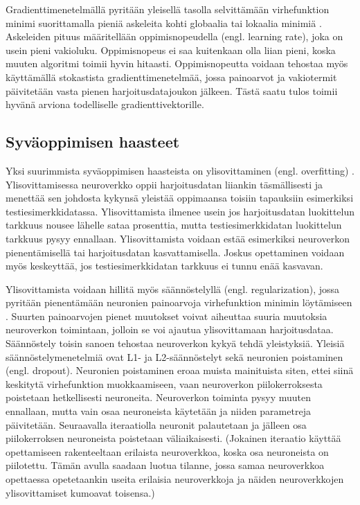 \documentclass[utf8]{gradu3}
\begin{document}
Gradienttimenetelmällä pyritään yleisellä tasolla selvittämään virhefunktion minimi suorittamalla pieniä askeleita kohti globaalia tai lokaalia minimiä \parencite{nielsen2015neural}. Askeleiden pituus määritellään oppimisnopeudella (engl. learning rate), joka on usein pieni vakioluku. Oppimisnopeus ei saa kuitenkaan olla liian pieni, koska muuten algoritmi toimii hyvin hitaasti. Oppimisnopeutta voidaan tehostaa myös käyttämällä stokastista gradienttimenetelmää, jossa painoarvot ja vakiotermit päivitetään vasta pienen harjoitusdatajoukon jälkeen. Tästä saatu tulos toimii hyvänä arviona todelliselle gradienttivektorille.

\subsection{Syväoppimisen haasteet}

Yksi suurimmista syväoppimisen haasteista on ylisovittaminen (engl. overfitting) \parencite{nielsen2015neural}. Ylisovittamisessa neuroverkko oppii harjoitusdatan liiankin täsmällisesti ja menettää sen johdosta kykynsä yleistää oppimaansa toisiin tapauksiin esimerkiksi testiesimerkkidatassa. Ylisovittamista ilmenee usein jos harjoitusdatan luokittelun tarkkuus nousee lähelle sataa prosenttia, mutta testiesimerkkidatan luokittelun tarkkuus pysyy ennallaan. Ylisovittamista voidaan estää esimerkiksi neuroverkon pienentämisellä tai harjoitusdatan kasvattamisella. Joskus opettaminen voidaan myös keskeyttää, jos testiesimerkkidatan tarkkuus ei tunnu enää kasvavan.

Ylisovittamista voidaan hillitä myös säännöstelyllä (engl. regularization), jossa pyritään pienentämään neuronien painoarvoja virhefunktion minimin löytämiseen \parencite{nielsen2015neural}. Suurten painoarvojen pienet muutokset voivat aiheuttaa suuria muutoksia neuroverkon toimintaan, jolloin se voi ajautua ylisovittamaan harjoitusdataa. Säännöstely toisin sanoen tehostaa neuroverkon kykyä tehdä yleistyksiä. Yleisiä säännöstelymenetelmiä ovat L1- ja L2-säännöstelyt sekä neuronien poistaminen (engl. dropout). Neuronien poistaminen eroaa muista mainituista siten, ettei siinä keskitytä virhefunktion muokkaamiseen, vaan neuroverkon piilokerroksesta poistetaan hetkellisesti neuroneita. Neuroverkon toiminta pysyy muuten ennallaan, mutta vain osaa neuroneista käytetään ja niiden parametreja päivitetään. Seuraavalla iteraatiolla neuronit palautetaan ja jälleen osa piilokerroksen neuroneista poistetaan väliaikaisesti. (Jokainen iteraatio käyttää opettamiseen rakenteeltaan erilaista neuroverkkoa, koska osa neuroneista on piilotettu. Tämän avulla saadaan luotua tilanne, jossa samaa neuroverkkoa opettaessa opetetaankin useita erilaisia neuroverkkoja ja näiden neuroverkkojen ylisovittamiset kumoavat toisensa.)
\end{document}
